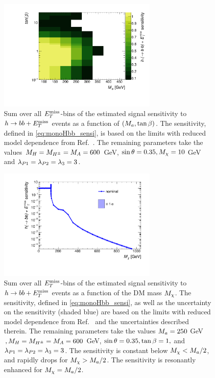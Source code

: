 \begin{figure}[tbp]
\centering
\includegraphics[width=0.7\textwidth]{texinputs/04_grid/figures/monoHbb_sensi_sum_bins_1_2_3_4_ma_vs_tanb_lin.pdf}
\caption[Sensitivity to $h\to bb + \MET$ signals in $\mA$ - $\tanb$ plane, summed across $\MET$ bins]
{
Sum over all $\MET$-bins of the estimated signal sensitivity to $h\to bb + \MET$ events as a function of $(M_{a},\tan\beta)$. The sensitivity, defined in \autoref{eq:monoHbb_sensi}, is based on the limits with reduced model dependence from Ref.~\cite{Aaboud:2017yqz}. The remaining parameters take the values
$ M_{H}=M_{H^{\pm}}=M_{A} = 600$ GeV, $ \sin\theta = 0.35, M_{\chi} = 10$ GeV and $ \lambda_{P1} = \lambda_{P2} = \lambda_{3} = 3 $.}
\label{fig:monoHbb_sensi_full_ma_tanb}
\end{figure}

\begin{figure}[tbp]
\centering
\includegraphics[width=0.7\textwidth]{texinputs/04_grid/figures/monoHbb_sensi_mDM_scan.pdf}
\caption[Sensitivity to $h\to bb + \MET$ signals with different $\mDM$, summed across $\MET$ bins]
{
Sum over all $\MET$-bins of the estimated signal sensitivity to $h\to bb + \MET$ events as a function of the DM mass $\mDM$. 
The sensitivity, defined in \autoref{eq:monoHbb_sensi}, as well as the uncertainty on the sensitivity (shaded blue)
are based on the limits with reduced model dependence from Ref.~\cite{Aaboud:2017yqz} and the uncertainties described therein. 
The remaining parameters take the values
$ M_{a} = 250 $ GeV$, M_{H}=M_{H^{\pm}}=M_{A} = 600$ GeV, $ \sin\theta = 0.35, \tan\beta = 1,$ and $ \lambda_{P1} = \lambda_{P2} = \lambda_{3} = 3 $. 
The sensitivity is constant below $M_{\chi} < M_{a}/2$, and rapidly drops for $M_{\chi} > M_{a}/2$. The sensitivity is resonantly enhanced for $M_{\chi} = M_{a}/2$.}
\label{fig:monoHbb_sensi_full_mDM}
\end{figure}

